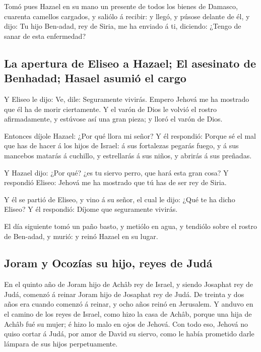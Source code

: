  Tomó pues Hazael en su mano un presente de todos los
bienes de Damasco, cuarenta camellos cargados, y saliólo á recibir: y
llegó, y púsose delante de él, y dijo: Tu hijo Ben-adad, rey de Siria,
me ha enviado á ti, diciendo: ¿Tengo de sanar de esta enfermedad?

\hypertarget{la-apertura-de-eliseo-a-hazael-el-asesinato-de-benhadad-hasael-asumiuxf3-el-cargo}{%
\subsection{La apertura de Eliseo a Hazael; El asesinato de Benhadad;
Hasael asumió el
cargo}\label{la-apertura-de-eliseo-a-hazael-el-asesinato-de-benhadad-hasael-asumiuxf3-el-cargo}}

 Y Eliseo le dijo: Ve, dile: Seguramente vivirás. Empero
Jehová me ha mostrado que él ha de morir ciertamente.  Y
el varón de Dios le volvió el rostro afirmadamente, y estúvose así una
gran pieza; y lloró el varón de Dios.

 Entonces díjole Hazael: ¿Por qué llora mi señor? Y él
respondió: Porque sé el mal que has de hacer á los hijos de Israel: á
sus fortalezas pegarás fuego, y á sus mancebos matarás á cuchillo, y
estrellarás á sus niños, y abrirás á sus preñadas.

 Y Hazael dijo: ¿Por qué? ¿es tu siervo perro, que hará
esta gran cosa? Y respondió Eliseo: Jehová me ha mostrado que tú has de
ser rey de Siria.

 Y él se partió de Eliseo, y vino á su señor, el cual le
dijo: ¿Qué te ha dicho Eliseo? Y él respondió: Díjome que seguramente
vivirás.

 El día siguiente tomó un paño basto, y metiólo en agua,
y tendiólo sobre el rostro de Ben-adad, y murió: y reinó Hazael en su
lugar.

\hypertarget{joram-y-ocozuxedas-su-hijo-reyes-de-juduxe1}{%
\subsection{Joram y Ocozías su hijo, reyes de
Judá}\label{joram-y-ocozuxedas-su-hijo-reyes-de-juduxe1}}

 En el quinto año de Joram hijo de Achâb rey de Israel, y
siendo Josaphat rey de Judá, comenzó á reinar Joram hijo de Josaphat rey
de Judá.  De treinta y dos años era cuando comenzó á
reinar, y ocho años reinó en Jerusalem.  Y anduvo en el
camino de los reyes de Israel, como hizo la casa de Achâb, porque una
hija de Achâb fué su mujer; é hizo lo malo en ojos de Jehová.
 Con todo eso, Jehová no quiso cortar á Judá, por amor de
David su siervo, como le había prometido darle lámpara de sus hijos
perpetuamente.

